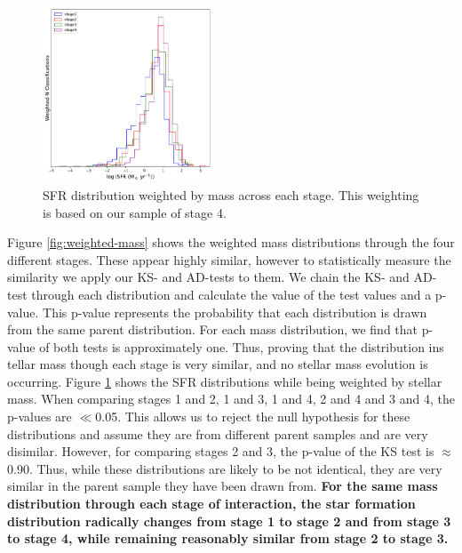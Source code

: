\begin{figure}
    \centering
    \includegraphics[width=0.45\textwidth]{Chapter3/figures/sfr-dist.pdf}
    \caption{SFR distribution weighted by mass across each stage. This weighting is based on our sample of stage 4.}
    \label{fig:weighted-sfr}
\end{figure}

Figure \ref{fig:weighted-mass} shows the weighted mass distributions through the four different stages. These appear highly similar, however to statistically measure the similarity we apply our KS- and AD-tests to them. We chain the KS- and AD- test through each distribution and calculate the value of the test values and a p-value. This p-value represents the probability that each distribution is drawn from the same parent distribution. For each mass distribution, we find that p-value of both tests is approximately one. Thus, proving that the distribution ins tellar mass though each stage is very similar, and no stellar mass evolution is occurring. Figure \ref{fig:weighted-sfr} shows the SFR distributions while being weighted by stellar mass. When comparing stages 1 and 2, 1 and 3, 1 and 4, 2 and 4 and 3 and 4, the p-values are $\ll$0.05. This allows us to reject the null hypothesis for these distributions and assume they are from different parent samples and are very disimilar. However, for comparing stages 2 and 3, the p-value of the KS test is $\approx$0.90. Thus, while these distributions are likely to be not identical, they are very similar in the parent sample they have been drawn from. \textbf{For the same mass distribution through each stage of interaction, the star formation distribution radically changes from stage 1 to stage 2 and from stage 3 to stage 4, while remaining reasonably similar from stage 2 to stage 3.}

